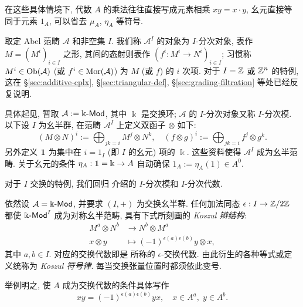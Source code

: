 在这些具体情境下, 代数 $A$ 的乘法往往直接写成元素相乘 $xy = x \cdot y$, 幺元直接等同于元素 $1_A$, 可以省去 $\mu_A$, $\eta_A$ 等符号.

\begin{example}[分次模与分次代数]\label{eg:graded-module}
	取定 Abel 范畴 $\mathcal{A}$ 和非空集 $I$. 我们称 $\mathcal{A}^I$ 的对象为 $I$-分次对象, 表作 $M = (M^i)_{i \in I}$ 之形, 其间的态射则表作 $(f^i: M^i \to N^i)_{i \in I}$; 习惯称 $M^i \in \operatorname{Ob}(\mathcal{A})$ (或 $f^i \in \operatorname{Mor}(\mathcal{A})$) 为 $M$ (或 $f$) 的 $i$ 次项. 对于 $I = \mathbb{Z}$ 或 $\mathbb{Z}^n$ 的特例, 这在 \S\ref{sec:additive-cplx}, \S\ref{sec:triangular-def}, \S\ref{sec:grading-filtration} 等处已经反复说明.
	
	具体起见, 暂取 $\mathcal{A} := \Bbbk\text{-}\mathsf{Mod}$, 其中 $\Bbbk$ 是交换环; $\mathcal{A}$ 的 $I$-分次对象又称 $I$-分次模. 以下设 $I$ 为幺半群, 在范畴 $\mathcal{A}^I$ 上定义双函子 $\otimes$ 如下:
	\begin{equation}\label{eqn:graded-module}
		(M \otimes N)^i := \bigoplus_{jk=i} M^j \otimes N^k, \quad (f \otimes g)^i := \bigoplus_{jk=i} f^j \otimes g^k .
	\end{equation}
	另外定义 $\bm{1}$ 为集中在 $i = 1_I$ (即 $I$ 的幺元) 项的 $\Bbbk$. 这些资料使得 $\mathcal{A}^I$ 成为幺半范畴. 关于幺元的条件 $\eta_A: \bm{1} = \Bbbk \to A$ 自动确保 $1_A := \eta_A(1) \in A^0$.
	
	对于 $I$ 交换的特例, 我们回归 \cite[定义 7.4.1]{Li1} 介绍的 $I$-分次模和 $I$-分次代数.

	依然设 $\mathcal{A} = \Bbbk\text{-}\mathsf{Mod}$, 并要求 $(I, +)$ 为交换幺半群. 任何加法同态 $\epsilon: I \to \mathbb{Z}/2\mathbb{Z}$ 都使 $\Bbbk\text{-}\mathsf{Mod}^I$ 成为对称幺半范畴, 具有下式所刻画的 \emph{Koszul 辫结构}:
	\begin{equation}\label{eqn:Koszul-braiding}\begin{aligned}
		M^a \otimes N^b & \to N^b \otimes M^a \\
		x \otimes y & \mapsto (-1)^{\epsilon(a)\epsilon(b)} y \otimes x ,
	\end{aligned}\end{equation}
	其中 $a, b \in I$. 对应的交换代数即是 \cite[定义 7.4.3]{Li1} 所称的 $\epsilon$-交换代数. 由此衍生的各种等式或定义统称为 \emph{Koszul 符号律}. 每当交换张量位置时都须依此变号.
	
	举例明之, 使 $A$ 成为交换代数的条件具体写作
	\[ x y = (-1)^{\epsilon(a) \epsilon(b)} yx, \quad x \in A^a, \; y \in A^b. \]
	

\end{example}
